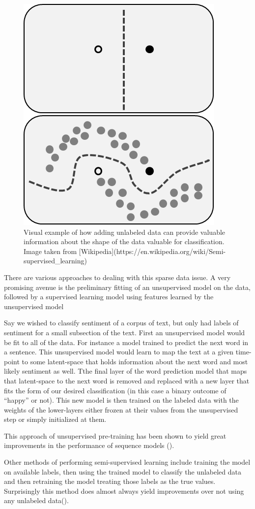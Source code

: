 \documentclass[]{book}
\theoremstyle{definition}
\theoremstyle{definition}
\theoremstyle{definition}
\theoremstyle{remark}
\begin{document}
\begin{figure}

{\centering \includegraphics[width=0.4\linewidth]{figures/semi-supervised} 

}

\caption{Visual example of how adding unlabeled data can provide valuable information about the shape of the data valuable for classification. Image taken from [Wikipedia](https://en.wikipedia.org/wiki/Semi-supervised_learning)}\label{fig:semisupervised}
\end{figure}

There are various approaches to dealing with this sparse data issue. A
very promising avenue is the preliminary fitting of an unsupervised
model on the data, followed by a supervised learning model using
features learned by the unsupervised model

Say we wished to classify sentiment of a corpus of text, but only had
labels of sentiment for a small subsection of the text. First an
unsupervised model would be fit to all of the data. For instance a model
trained to predict the next word in a sentence. This unsupervised model
would learn to map the text at a given time-point to some latent-space
that holds information about the next word and most likely sentiment as
well. Tthe final layer of the word prediction model that maps that
latent-space to the next word is removed and replaced with a new layer
that fits the form of our desired classification (in this case a binary
outcome of ``happy'' or not). This new model is then trained on the
labeled data with the weights of the lower-layers either frozen at their
values from the unsupervised step or simply initialized at them.

This approach of unsupervised pre-training has been shown to yield great
improvements in the performance of sequence models
(\citet{semi_supervised}).

Other methods of performing semi-supervised learning include training
the model on available labels, then using the trained model to classify
the unlabeled data and then retraining the model treating those labels
as the true values. Surprisingly this method does almost always yield
improvements over not using any unlabeled data(\citet{semi_supervised}).
\end{document}
